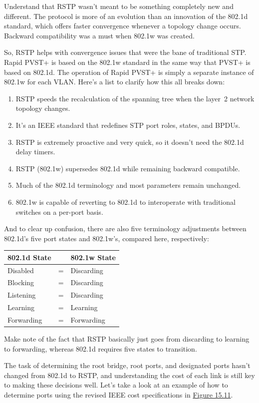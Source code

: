 Understand that RSTP wasn't meant to be something completely new and
different. The protocol is more of an evolution than an innovation of
the 802.1d standard, which offers faster convergence whenever a topology
change occurs. Backward compatibility was a must when 802.1w was
created.

So, RSTP helps with convergence issues that were the bane of traditional
STP. Rapid PVST+ is based on the 802.1w standard in the same way that
PVST+ is based on 802.1d. The operation of Rapid PVST+ is simply a
separate instance of 802.1w for each VLAN. Here's a list to clarify how
this all breaks down:

\begin{enumerate}
\tightlist
\item
  RSTP speeds the recalculation of the spanning tree when the layer~2
  network topology changes.
\item
  It's an IEEE standard that redefines STP port roles, states, and
  BPDUs.
\item
  RSTP is extremely proactive and very quick, so it doesn't need the
  802.1d delay timers.
\item
  RSTP (802.1w) supersedes 802.1d while remaining backward compatible.
\item
  Much of the 802.1d terminology and most parameters remain unchanged.
\item
  802.1w is capable of reverting to 802.1d to interoperate with
  traditional switches on a per-port basis.
\end{enumerate}

And to clear up
confusion, there are also five terminology adjustments between 802.1d's
five port states and 802.1w's, compared here, respectively:

\begin{longtable}[]{@{}lll@{}}
\toprule
802.1d State & & 802.1w State\tabularnewline
\midrule
\endhead
Disabled & = & Discarding\tabularnewline
Blocking & = & Discarding\tabularnewline
Listening & = & Discarding\tabularnewline
Learning & = & Learning\tabularnewline
Forwarding & = & Forwarding\tabularnewline
\bottomrule
\end{longtable}

Make note of the fact that RSTP basically just goes from discarding to
learning to forwarding, whereas 802.1d requires five states to
transition.

The task of determining the root bridge, root ports, and designated
ports hasn't changed from 802.1d to RSTP, and understanding the cost of
each link is still key to making these decisions well. Let's take a look
at an example of how to determine ports using the revised IEEE cost
specifications in
\protect\hyperlink{c15.xhtmlux5cux23figure15-11}{Figure 15.11}.

